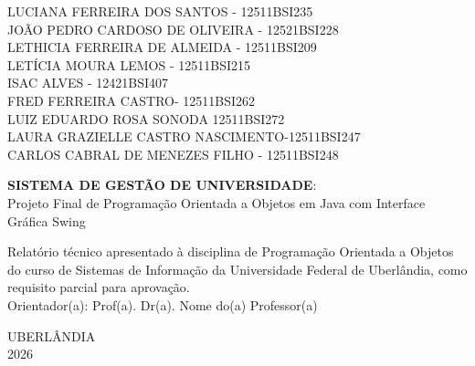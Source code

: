 \documentclass[12pt, a4paper]{article}
\begin{document}
\begin{titlepage}
    \begin{center}
        LUCIANA FERREIRA DOS SANTOS - 12511BSI235 \\
        JOÃO PEDRO CARDOSO DE OLIVEIRA - 12521BSI228 \\
        LETHICIA FERREIRA DE ALMEIDA - 12511BSI209 \\
        LETÍCIA MOURA LEMOS - 12511BSI215 \\
        ⁠ISAC ALVES - 12421BSI407 \\
        FRED FERREIRA CASTRO- 12511BSI262 \\
        LUIZ EDUARDO ROSA SONODA 12511BSI272 \\
        LAURA GRAZIELLE CASTRO NASCIMENTO-12511BSI247 \\
        CARLOS CABRAL DE MENEZES FILHO - 12511BSI248 \\
        

        \vfill

        \textbf{SISTEMA DE GESTÃO DE UNIVERSIDADE}: \\
        Projeto Final de Programação Orientada a Objetos em Java com Interface Gráfica Swing

        \vspace{1.5cm}

        \begin{flushright}
            \begin{minipage}{8cm}
                \singlespacing
                \small
                Relatório técnico apresentado à disciplina de Programação Orientada a Objetos do curso de Sistemas de Informação da Universidade Federal de Uberlândia, como requisito parcial para aprovação. \\
                \vspace{0.3cm}
                Orientador(a): Prof(a). Dr(a). Nome do(a) Professor(a)
            \end{minipage}
        \end{flushright}

        \vfill

        UBERLÂNDIA \\
        2026
    \end{center}
\end{titlepage}
\end{document}
